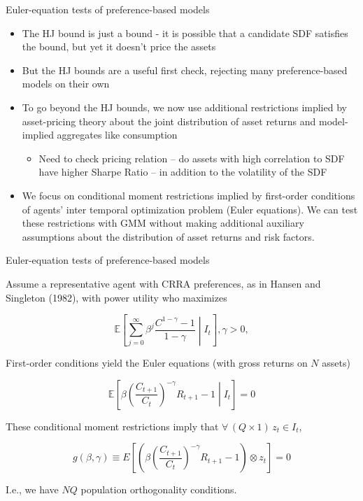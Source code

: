 \documentclass[xcolor=table, aspectratio=169]{beamer}
\newcommand{\E}{\mathbb{E}}
\begin{document}


\begin{frame}{Euler-equation tests of preference-based models}
\begin{itemize}
\item The HJ bound is just a bound - it is possible that a candidate SDF satisfies the bound, but yet it doesn't price the assets


\item But the HJ bounds are a useful first check, rejecting many preference-based models on their own 

\item To go beyond the HJ bounds, we now use additional restrictions implied by asset-pricing theory about the joint distribution of asset returns and model-implied aggregates like consumption
\begin{itemize}
    \item Need to check pricing relation -- do assets with high correlation to SDF have higher Sharpe Ratio -- in addition to the volatility of the SDF
\end{itemize}


\item We focus on conditional moment restrictions implied by first-order conditions of agents' inter temporal optimization problem (Euler equations). We can test these restrictions with GMM without making additional auxiliary assumptions about the distribution of asset returns and risk factors. 
\end{itemize}

\end{frame}


\begin{frame}{Euler-equation tests of preference-based models}

Assume a representative agent with CRRA preferences, as in Hansen and Singleton (1982), with power utility who maximizes

$$ \E\left[\sum\limits^\infty_{j=0} \beta^j \dfrac{C^{1-\gamma}-1}{1-\gamma} \middle\vert I_t \right],\gamma > 0,$$

First-order conditions yield the Euler equations (with gross returns on $N$ assets)

$$ \E\left[\beta\left(\dfrac{C_{t+1}}{C_t}\right)^{-\gamma} R_{t+1} - 1\middle\vert I_t\right] = 0 $$

These conditional moment restrictions imply that $\forall \hspace{2pt} (Q \times 1) \hspace{2pt} z_t \in I_t$,

$$ g(\beta,\gamma) \equiv E\left[\left(\beta\left(\dfrac{C_{t+1}}{C_t}\right)^{-\gamma} R_{t+1}-1\right) \otimes z_t\right] = 0$$

I.e., we have $NQ$ population orthogonality conditions. 

\end{frame}
\end{document}
